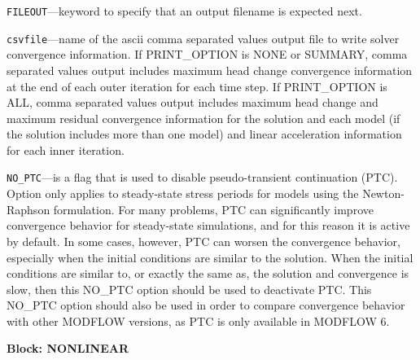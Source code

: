 \begin{description}
\item \texttt{FILEOUT}---keyword to specify that an output filename is expected next.

\item \texttt{csvfile}---name of the ascii comma separated values output file to write solver convergence information. If PRINT\_OPTION is NONE or SUMMARY, comma separated values output includes maximum head change convergence information at the end of each outer iteration for each time step. If PRINT\_OPTION is ALL, comma separated values output includes maximum head change and maximum residual convergence information for the solution and each model (if the solution includes more than one model) and linear acceleration information for each inner iteration.

\item \texttt{NO\_PTC}---is a flag that is used to disable pseudo-transient continuation (PTC). Option only applies to steady-state stress periods for models using the Newton-Raphson formulation. For many problems, PTC can significantly improve convergence behavior for steady-state simulations, and for this reason it is active by default.  In some cases, however, PTC can worsen the convergence behavior, especially when the initial conditions are similar to the solution.  When the initial conditions are similar to, or exactly the same as, the solution and convergence is slow, then this NO\_PTC option should be used to deactivate PTC.  This NO\_PTC option should also be used in order to compare convergence behavior with other MODFLOW versions, as PTC is only available in MODFLOW 6.

\end{description}
\item \textbf{Block: NONLINEAR}

